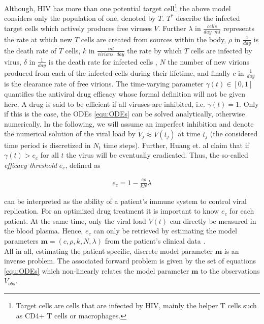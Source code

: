 Although, HIV has more than one potential target cell\footnote{Target cells are cells that are infected by HIV, mainly the helper T cells such as CD4+ T cells or macrophages.} the above model considers only the population of one, denoted by $T$.
$T^*$ describe the infected target cells which actively produces free viruses $V$. 
Further $\lambda$ in $\frac{cells}{day\cdot ml}$ represents the rate at which new $T$ cells are created from sources within the body, $\rho$ in $\frac{1}{day}$ is the death rate of $T$ cells, $k$ in $\frac{ml}{virions\cdot day}$ the rate by which $T$ cells are infected by virus, $\delta$ in $\frac{1}{day}$ is the death rate for infected cells , $N$ the number of new virions produced from each of the infected cells during their lifetime, and finally $c$ in $\frac{1}{day}$ is the clearance rate of free virions. 
The time-varying parameter $\gamma(t) \in [0,1]$ quantifies the antiviral drug efficacy whose formal definition will not be given here.
A drug is said to be efficient if all viruses are inhibited, i.e. $\gamma(t) = 1$.
Only if this is the case, the ODEs \ref{equ:ODEs} can be solved analytically, otherwise numerically.
In the following, we will assume an imperfect inhibition and denote the numerical solution of the viral load by $\tilde{V}_j \approx V(t_j)$ at time $t_j$ (the considered time period is discretized in $N_t$ time steps).
Further, Huang et. al claim that if $\gamma(t) > e_c$ for all $t$ the virus will be eventually eradicated.
Thus, the so-called \textit{efficacy threshold} $e_c$, defined as

\begin{align}
 e_c = 1-\frac{c\rho}{kN}\lambda
 \label{equ:e_c}
\end{align}

can be interpreted as the ability of a patient’s immune system to control viral replication.
For an optimized drug treatment it is important to know $e_c$ for each patient.
At the same time, only the viral load $V(t)$ can directly be measured in the blood plasma.
Hence, $e_c$ can only be retrieved by estimating the model parameters $\mathbf{m} = (c, \rho, k, N, \lambda)$ from the patient's clinical data  \cite{huang2003modeling}.\\
All in all, estimating the patient specific, discrete model parameter $\mathbf{m}$ is an inverse problem.
The associated forward problem is given by the set of equations \ref{equ:ODEs} which non-linearly relates the model parameter $\mathbf{m}$ to the observations $V_{obs}$.
